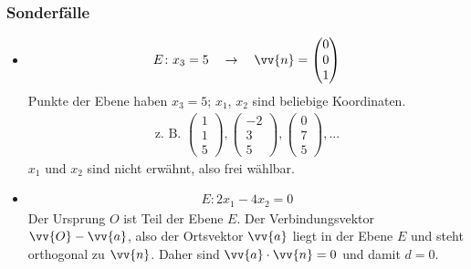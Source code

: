 \subsubsection{Sonderfälle}
\begin{itemize}
  \item
  \begin{gather*}
    E \colon x_3 = 5 \quad\rightarrow\quad \vv{n} = \begin{pmatrix}0 \\ 0 \\ 1\end{pmatrix}
  \end{gather*}
  Punkte der Ebene haben $x_3 = 5$; $x_1$, $x_2$ sind beliebige Koordinaten.
  \begin{gather*}
    \text{z. B. } \begin{pmatrix}1 \\ 1 \\ 5\end{pmatrix}, \begin{pmatrix}-2 \\ 3 \\ 5\end{pmatrix}, \begin{pmatrix}0 \\ 7 \\ 5\end{pmatrix}, ...
  \end{gather*}
  $x_1$ und $x_2$ sind nicht erwähnt, also frei wählbar.
  \item
  \begin{gather*}
    E \colon 2x_1 - 4x_2 = 0
  \end{gather*}
  Der Ursprung $O$ ist Teil der Ebene $E$. Der Verbindungsvektor $\vv{O} - \vv{a}$, also der Ortsvektor $\vv{a}$ liegt in der Ebene $E$ und steht orthogonal zu $\vv{n}$. Daher sind $\vv{a} \cdot \vv{n} = 0$ und damit $d = 0$.
\end{itemize}
